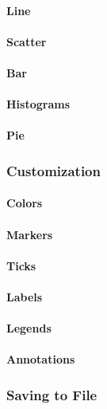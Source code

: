 \paragraph{Line}

\paragraph{Scatter}

\paragraph{Bar}

\paragraph{Histograms}

\paragraph{Pie}

\subsubsection{Customization}

\paragraph{Colors}

\paragraph{Markers}

\paragraph{Ticks}

\paragraph{Labels}

\paragraph{Legends}

\paragraph{Annotations}

\subsubsection{Saving to File}